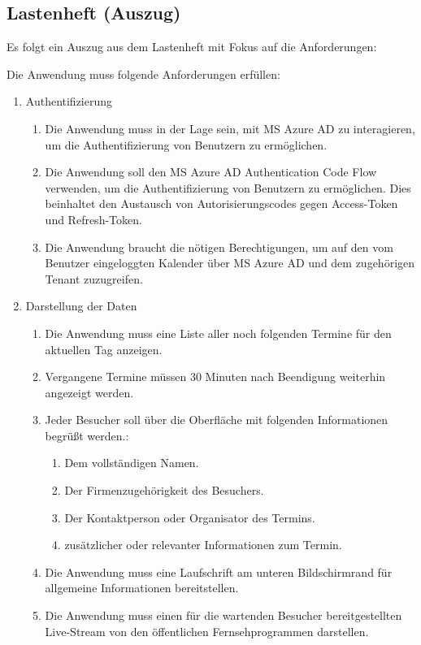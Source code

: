 \subsection{Lastenheft (Auszug)}
\label{app:Lastenheft}
Es folgt ein Auszug aus dem Lastenheft mit Fokus auf die Anforderungen:

Die Anwendung muss folgende Anforderungen erfüllen: 
\begin{enumerate}[itemsep=0em,partopsep=0em,parsep=0em,topsep=0em]
\item Authentifizierung
	\begin{enumerate}
	\item Die Anwendung muss in der Lage sein, mit \ac{MS} Azure \ac{AD} zu interagieren, um die Authentifizierung von Benutzern zu ermöglichen.
	\item Die Anwendung soll den \ac{MS} Azure \ac{AD} Authentication Code Flow verwenden, um die Authentifizierung von Benutzern zu ermöglichen. Dies beinhaltet den Austausch von Autorisierungscodes gegen Access-Token und Refresh-Token.
	\item Die Anwendung braucht die nötigen Berechtigungen, um auf den vom Benutzer eingeloggten Kalender über \ac{MS} Azure \ac{AD} und dem zugehörigen Tenant zuzugreifen.
	\end{enumerate}
\item Darstellung der Daten
	\begin{enumerate}
	\item Die Anwendung muss eine Liste aller noch folgenden Termine für den aktuellen Tag anzeigen.
	\item Vergangene Termine müssen 30 Minuten nach Beendigung weiterhin angezeigt werden.
	\item Jeder Besucher soll über die Oberfläche mit folgenden Informationen begrüßt werden.:
	\begin{enumerate}
		\item Dem vollständigen Namen.
		\item Der Firmenzugehörigkeit des Besuchers.
		\item Der Kontaktperson oder Organisator des Termins.
		\item \Ggfs zusätzlicher oder relevanter Informationen zum Termin.
	\end{enumerate}
	\item Die Anwendung muss eine Laufschrift am unteren Bildschirmrand für allgemeine Informationen bereitstellen.
	\item Die Anwendung muss einen für die wartenden Besucher bereitgestellten Live-Stream von \zB den öffentlichen Fernsehprogrammen darstellen.

\end{enumerate}
\end{enumerate}
